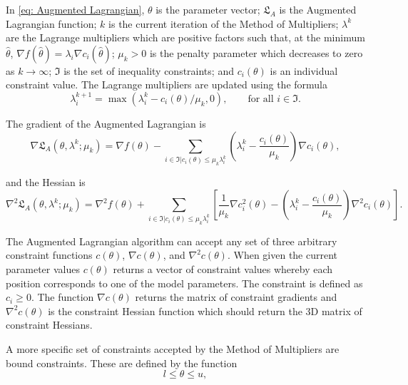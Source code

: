 \begin{htmlonly}
\begin{htmlonly}
\noindent  In \eqref{eq: Augmented Lagrangian}, $\theta$ is the parameter vector; $\mathfrak{L}_A$ is the Augmented Lagrangian function; $k$ is the current iteration of the Method of Multipliers; $\lambda^k$ are the Lagrange multipliers which are positive factors such that, at the minimum $\hat\theta$, $\nabla f(\hat\theta) = \lambda_i \nabla c_i(\hat\theta)$; $\mu_k > 0$ is the penalty parameter which decreases to zero as $k \to \infty$; $\mathfrak{I}$ is the set of inequality constraints; and $c_i(\theta)$ is an individual constraint value.  The Lagrange multipliers are updated using the formula
\begin{equation}
    \lambda_i^{k+1} = \max(\lambda_i^k - c_i(\theta)/\mu_k, 0), \qquad \textrm{for all } i \in \mathfrak{I}.
\end{equation}

The gradient of the Augmented Lagrangian is
\begin{equation}
    \nabla \mathfrak{L}_A(\theta, \lambda^k; \mu_k) = 
        \nabla f(\theta)
        - \sum_{i \in \mathfrak{I} | c_i(\theta) \leqslant \mu_k \lambda_i^k}
            \left( \lambda_i^k - \frac{c_i(\theta)}{\mu_k} \right) \nabla c_i(\theta),
\end{equation}

\noindent and the Hessian is
\begin{equation}
    \nabla^2 \mathfrak{L}_A(\theta, \lambda^k; \mu_k) = 
        \nabla^2 f(\theta)
        + \sum_{i \in \mathfrak{I} | c_i(\theta) \leqslant \mu_k \lambda_i^k}
            \left[
                \frac{1}{\mu_k} \nabla c_i^2(\theta)
                - \left( \lambda_i^k - \frac{c_i(\theta)}{\mu_k} \right) \nabla^2 c_i(\theta)
            \right].
\end{equation}

The Augmented Lagrangian algorithm can accept any set of three arbitrary constraint functions $c(\theta)$, $\nabla c(\theta)$, and $\nabla^2 c(\theta)$.  When given the current parameter values $c(\theta)$ returns a vector of constraint values whereby each position corresponds to one of the model parameters.  The constraint is defined as $c_i \geqslant 0$.  The function $\nabla c(\theta)$ returns the matrix of constraint gradients and $\nabla^2 c(\theta)$ is the constraint Hessian function which should return the 3D matrix of constraint Hessians.

A more specific set of constraints accepted by the Method of Multipliers are bound constraints.  These are defined by the function
\begin{equation}
    l \leqslant \theta \leqslant u,
\end{equation}


\end{htmlonly}
\end{htmlonly}
